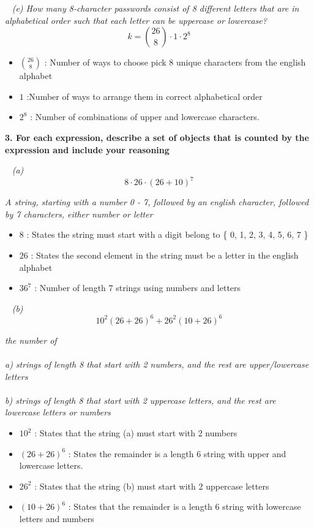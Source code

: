 \documentclass[12pt, letterpaper]{article}
\begin{document}
\-\ \newline
\it{ (e) How many 8-character passwords consist of 8 different letters that are in alphabetical order such that each letter can be uppercase or lowercase? }
\[ k =  {26 \choose 8} \cdot 1 \cdot 2^{8}\]

\begin{itemize}
    \item \(26 \choose 8\) : Number of ways to choose pick 8 unique characters from the english alphabet
    \item \(1\) :Number of ways to arrange them in correct alphabetical order
    \item \(2^{8}\) : Number of combinations of upper and lowercase characters. 
\end{itemize}


\newpage
\bf{ 3. For each expression, describe a set of objects that is counted by the expression and include your reasoning }

\-\ \newline
\it{ (a) }
\[ 8 \cdot 26 \cdot (26 + 10)^{7} \]

\emph{A string, starting with a number 0 - 7, followed by an english character, followed by 7 characters, either number or letter}

\begin{itemize}
    \item \(8\) : States the string must start with a digit belong to \{ 0, 1, 2, 3, 4, 5, 6, 7 \}
    \item \(26\) : States the second element in the string must be a letter in the english alphabet
    \item \(36^{7}\) : Number of length 7 strings using numbers and letters
\end{itemize}

\-\ \newline
\it{ (b) }
\[ 10^{2}(26 + 26)^{6} + 26^2(10 + 26)^6 \]

\emph{the number of \\\\
a) strings of length 8 that start with 2 numbers, and the rest are upper/lowercase letters \\\\
b) strings of length 8 that start with 2 uppercase letters, and the rest are lowercase letters or numbers}

\begin{itemize}
    \item \(10^{2}\) : States that the string (a) must start with 2 numbers
    \item \((26 + 26)^{6}\) : States the remainder is a length 6 string with upper and lowercase letters.
    \item \(26^{2}\) : States that the string (b) must start with 2 uppercase letters
    \item \( (10+26)^{6} \) : States that the remainder is a length 6 string with lowercase letters and numbers
\end{itemize}
\end{document}
